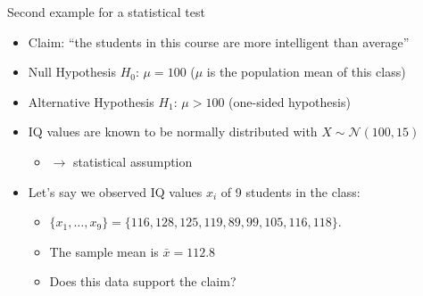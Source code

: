 	\begin{frame}[c]{Second example for a statistical test}
		
		\begin{itemize}
			\item Claim: \alert{``the students in this course are more intelligent
				than average''}
			\bigskip
			\pause
			\item \alert{Null Hypothesis $H_0$}: $\mu=100$ ($\mu$ is the population
			mean of this class)
			\item \alert{Alternative Hypothesis $H_1$}: $\mu>100$ (\alert{one-sided} hypothesis)
			\bigskip
			\pause
			\item IQ values are known to be normally distributed with $X \sim
			\mathcal{N}(100,15)$
			\begin{itemize}
				\item$\to$ statistical assumption
			\end{itemize}
			
			\bigskip
			\pause
			
			\item Let's say we observed IQ values $x_i$ of 9 students in the class:
			\begin{itemize}
				\item $\{x_1,\dots,x_9\} = \{116, 128, 125, 119, 89, 99, 105, 116, 118\}$.
				\item The \alert{sample mean} is $\bar{x}=112.8$
				\item Does this data support the claim?
			\end{itemize}	
			
		\end{itemize}	
		
	\end{frame}
